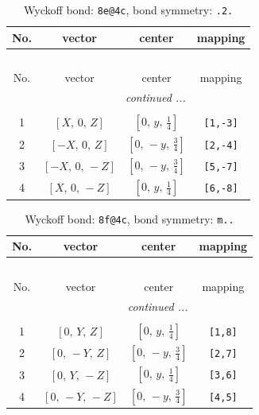 \documentclass[fleqn,8pt]{jsarticle}
\begin{document}
\renewcommand{\arraystretch}{1.2}
\begin{longtable}{cccc}
\caption{Wyckoff bond: {\tt 8e@4c}, bond symmetry: {\tt .2.}}
 \\
 \hline \hline
No. & vector & center & mapping \\ \hline \endfirsthead

\multicolumn{3}{l}{\tablename\ \thetable{}} \\
 \hline \hline
No. & vector & center & mapping \\ \hline \endhead

 \hline \hline
\multicolumn{3}{r}{\footnotesize\it continued ...} \\ \endfoot

 \hline \hline
\multicolumn{3}{r}{} \\ \endlastfoot

1 & $\left[ X,\, 0,\, Z \right]$ & $\left[ 0,\, y,\, \frac{1}{4} \right]$ & {\tt [1,-3]} \\ \hline
2 & $\left[ - X,\, 0,\, Z \right]$ & $\left[ 0,\, - y,\, \frac{3}{4} \right]$ & {\tt [2,-4]} \\ \hline
3 & $\left[ - X,\, 0,\, - Z \right]$ & $\left[ 0,\, - y,\, \frac{3}{4} \right]$ & {\tt [5,-7]} \\ \hline
4 & $\left[ X,\, 0,\, - Z \right]$ & $\left[ 0,\, y,\, \frac{1}{4} \right]$ & {\tt [6,-8]} \\
\end{longtable}
\renewcommand{\arraystretch}{1.2}
\begin{longtable}{cccc}
\caption{Wyckoff bond: {\tt 8f@4c}, bond symmetry: {\tt m..}}
 \\
 \hline \hline
No. & vector & center & mapping \\ \hline \endfirsthead

\multicolumn{3}{l}{\tablename\ \thetable{}} \\
 \hline \hline
No. & vector & center & mapping \\ \hline \endhead

 \hline \hline
\multicolumn{3}{r}{\footnotesize\it continued ...} \\ \endfoot

 \hline \hline
\multicolumn{3}{r}{} \\ \endlastfoot

1 & $\left[ 0,\, Y,\, Z \right]$ & $\left[ 0,\, y,\, \frac{1}{4} \right]$ & {\tt [1,8]} \\ \hline
2 & $\left[ 0,\, - Y,\, Z \right]$ & $\left[ 0,\, - y,\, \frac{3}{4} \right]$ & {\tt [2,7]} \\ \hline
3 & $\left[ 0,\, Y,\, - Z \right]$ & $\left[ 0,\, y,\, \frac{1}{4} \right]$ & {\tt [3,6]} \\ \hline
4 & $\left[ 0,\, - Y,\, - Z \right]$ & $\left[ 0,\, - y,\, \frac{3}{4} \right]$ & {\tt [4,5]} \\
\end{longtable}
\end{document}
